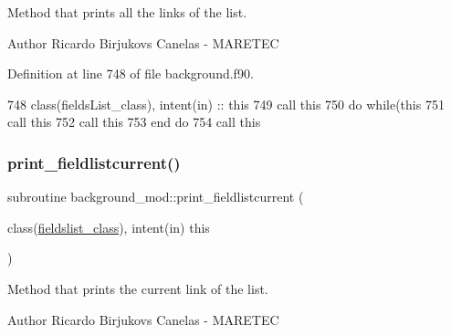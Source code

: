 Method that prints all the links of the list. 

\begin{DoxyAuthor}{Author}
Ricardo Birjukovs Canelas -\/ M\+A\+R\+E\+T\+EC 
\end{DoxyAuthor}


Definition at line 748 of file background.\+f90.


\begin{DoxyCode}
748     \textcolor{keywordtype}{class}(fieldsList\_class), \textcolor{keywordtype}{intent(in)} :: this
749     \textcolor{keyword}{call }this%
750     \textcolor{keywordflow}{do} \textcolor{keywordflow}{while}(this%
751         \textcolor{keyword}{call }this%
752         \textcolor{keyword}{call }this%
753 \textcolor{keywordflow}{    end do}
754     \textcolor{keyword}{call }this%
\end{DoxyCode}
\mbox{\label{namespacebackground__mod_a2bd18f3830c0667741efd086d36753db}} 
\subsubsection{\texorpdfstring{print\+\_\+fieldlistcurrent()}{print\_fieldlistcurrent()}}
{\footnotesize\ttfamily subroutine background\+\_\+mod\+::print\+\_\+fieldlistcurrent (\begin{DoxyParamCaption}\item[{class(\mbox{\hyperlink{structbackground__mod_1_1fieldslist__class}{fieldslist\+\_\+class}}), intent(in)}]{this }\end{DoxyParamCaption})\hspace{0.3cm}{\ttfamily [private]}}



Method that prints the current link of the list. 

\begin{DoxyAuthor}{Author}
Ricardo Birjukovs Canelas -\/ M\+A\+R\+E\+T\+EC 
\end{DoxyAuthor}


